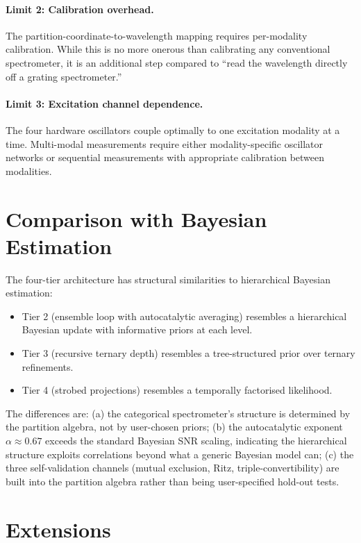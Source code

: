 \documentclass[twocolumn,11pt,a4paper]{article}
\theoremstyle{thmstyle}
\theoremstyle{axiomstyle}
\theoremstyle{definition}
\theoremstyle{remark}
\begin{document}
\paragraph{Limit 2: Calibration overhead.} The partition-coordinate-to-wavelength mapping requires per-modality calibration. While this is no more onerous than calibrating any conventional spectrometer, it is an additional step compared to ``read the wavelength directly off a grating spectrometer.''

\paragraph{Limit 3: Excitation channel dependence.} The four hardware oscillators couple optimally to one excitation modality at a time. Multi-modal measurements require either modality-specific oscillator networks or sequential measurements with appropriate calibration between modalities.

\section{Comparison with Bayesian Estimation}
\label{sec:bayesian}

The four-tier architecture has structural similarities to hierarchical Bayesian estimation:
\begin{itemize}[nosep]
\item Tier 2 (ensemble loop with autocatalytic averaging) resembles a hierarchical Bayesian update with informative priors at each level.
\item Tier 3 (recursive ternary depth) resembles a tree-structured prior over ternary refinements.
\item Tier 4 (strobed projections) resembles a temporally factorised likelihood.
\end{itemize}

The differences are: (a) the categorical spectrometer's structure is determined by the partition algebra, not by user-chosen priors; (b) the autocatalytic exponent $\alpha\approx 0.67$ exceeds the standard Bayesian SNR scaling, indicating the hierarchical structure exploits correlations beyond what a generic Bayesian model can; (c) the three self-validation channels (mutual exclusion, Ritz, triple-convertibility) are built into the partition algebra rather than being user-specified hold-out tests.

\section{Extensions}
\label{sec:extensions}
\end{document}

